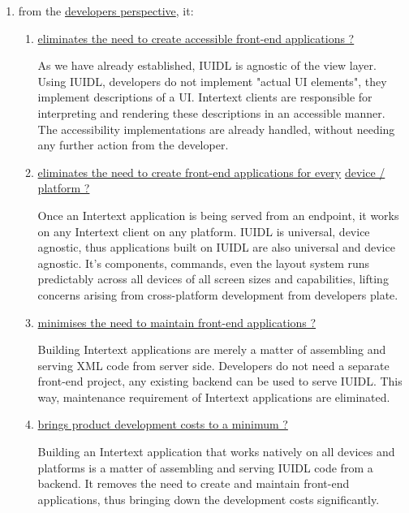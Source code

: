 \begin{enumerate}
\begin{enumerate}
  \end{enumerate}
  \item from the \underline{developers perspective}, it:
  \begin{enumerate}
    \item \underline{ eliminates the need to create accessible front-end applications ?}

    As we have already established, IUIDL is agnostic of the view layer. Using IUIDL, developers do not implement "actual UI elements", they implement descriptions of a UI. Intertext clients are responsible for interpreting and rendering these descriptions in an accessible manner. The accessibility implementations are already handled, without needing any further action from the developer.
    
    \item \underline{eliminates the need to create front-end applications for every} \newline \underline{device / platform ?}

    Once an Intertext application is being served from an endpoint, it works on any Intertext client on any platform. IUIDL is universal, device agnostic, thus applications built on IUIDL are also universal and device agnostic. It's components, commands, even the layout system runs predictably across all devices of all screen sizes and capabilities, lifting concerns arising from cross-platform development from developers plate.
    
    \item \underline{minimises the need to maintain front-end applications ?}

    Building Intertext applications are merely a matter of assembling and serving XML code from server side. Developers do not need a separate front-end project, any existing backend can be used to serve IUIDL. This way, maintenance requirement of Intertext applications are eliminated.
    
    \item \underline{brings product development costs to a minimum ?}

    Building an Intertext application that works natively on all devices and platforms is a matter of assembling and serving IUIDL code from a backend. It removes the need to create and maintain front-end applications, thus bringing down the development costs significantly.
    
  \end{enumerate}
\end{enumerate}

